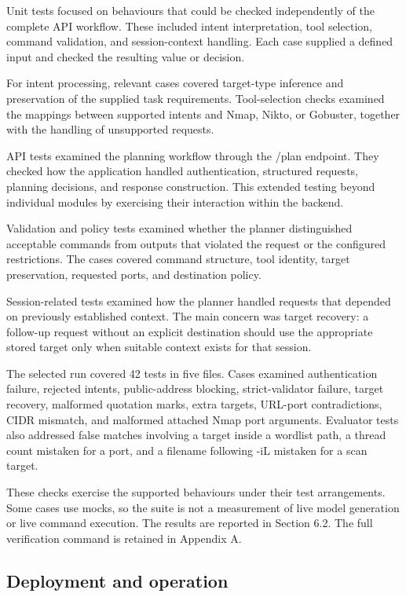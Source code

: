 \documentclass[
]{article}
\begin{document}
Unit tests focused on behaviours that could be checked independently of
the complete API workflow. These included intent interpretation, tool
selection, command validation, and session-context handling. Each case
supplied a defined input and checked the resulting value or decision.

For intent processing, relevant cases covered target-type inference and
preservation of the supplied task requirements. Tool-selection checks
examined the mappings between supported intents and Nmap, Nikto, or
Gobuster, together with the handling of unsupported requests.

API tests examined the planning workflow through the /plan endpoint.
They checked how the application handled authentication, structured
requests, planning decisions, and response construction. This extended
testing beyond individual modules by exercising their interaction within
the backend.

Validation and policy tests examined whether the planner distinguished
acceptable commands from outputs that violated the request or the
configured restrictions. The cases covered command structure, tool
identity, target preservation, requested ports, and destination policy.

Session-related tests examined how the planner handled requests that
depended on previously established context. The main concern was target
recovery: a follow-up request without an explicit destination should use
the appropriate stored target only when suitable context exists for that
session.

The selected run covered 42 tests in five files. Cases examined
authentication failure, rejected intents, public-address blocking,
strict-validator failure, target recovery, malformed quotation marks,
extra targets, URL-port contradictions, CIDR mismatch, and malformed
attached Nmap port arguments. Evaluator tests also addressed false
matches involving a target inside a wordlist path, a thread count
mistaken for a port, and a filename following -iL mistaken for a scan
target.

These checks exercise the supported behaviours under their test
arrangements. Some cases use mocks, so the suite is not a measurement of
live model generation or live command execution. The results are
reported in Section 6.2. The full verification command is retained in
Appendix A.

\hypertarget{deployment-and-operation}{%
\subsection{Deployment and operation}\label{deployment-and-operation}}
\end{document}
